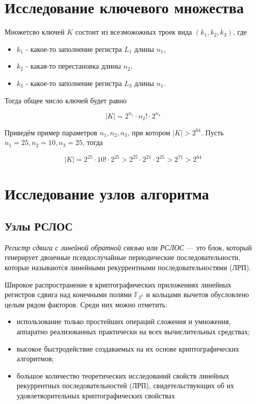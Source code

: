 \documentclass[a4paper,12pt]{article}
\theoremstyle{definition}
\begin{document}
	\section{Исследование ключевого множества}
	
	Множетсво ключей $K$ состоит из всезможожных троек вида $(k_1, k_2, k_3)$, где 
	
	\begin{itemize}[topsep=0pt, itemsep=0pt, parsep=0pt]
	\item $k_1$ - какое-то заполнение регистра $L_1$ длины $n_1$,
	\item $k_2$ - какая-то перестановка длины $n_2$, 
	\item $k_3$ - какое-то заполнение регистра $L_3$ длины $n_1$.
	\end{itemize}
	
	Тогда общее число ключей будет равно
	
	\[ |K| = 2^{n_1} \cdot n_2! \cdot 2^{n_3} \]
	
	Приведём пример параметров $n_1, n_2, n_3$, при котором $|K| > 2^{64}$. Пусть $n_1=25, n_2=10, n_3=25$, тогда
	
	\[ |K| = 2^{25} \cdot 10! \cdot 2^{25} > 2^{25} \cdot 2^{21} \cdot 2^{25} > 2^{71} > 2^{64} \]
	
	\section{Исследование узлов алгоритма}
	
	\subsection{Узлы РСЛОС} \label{Узлы РСЛОС}
	
	\textit{Регистр сдвига с линейной обратной связью} или \textit{РСЛОС} --- это блок, который генерирует двоичные псевдослучайные периодические последовательности, которые называются линейными рекуррентными последовательностями (ЛРП). 
	
	Широкое распространение в криптографических приложениях линейных регистров сдвига над конечными полями $\mathbb{F}_{2^n}$ и кольцами вычетов обусловлено целым рядом факторов. Среди них можно отметить:
	
	\begin{itemize}[topsep=0pt, itemsep=0pt, parsep=0pt]
		\item использование только простейших операций сложения и умножения, аппаратно реализованных практически на всех вычислительных средствах;
		\item высокое быстродействие создаваемых на их основе криптографических алгоритмов;
		\item большое количество теоретических исследований свойств линейных рекуррентных последовательностей (ЛРП), свидетельствующих об их удовлетворительных криптографических свойствах
	\end{itemize}
\end{document}
